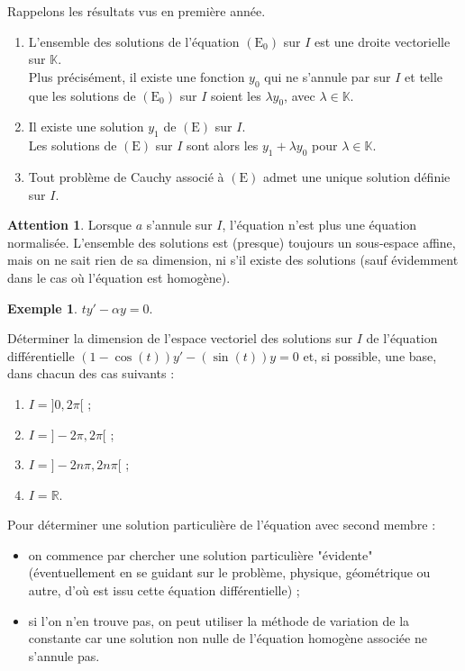 \documentclass[french]{article}
\newcommand{\R}{\mathbb{R}}
\newcommand{\K}{\mathbb{K}}
\theoremstyle{plain}
\theoremstyle{definition}
\newtheorem*{ex}{Exemple}
\newtheorem*{attention}{Attention}
\theoremstyle{remark}
\begin{document}
Rappelons les résultats vus en première année.

\begin{prop}%
	\begin{enumerate}
		\item L'ensemble des solutions de l'équation $(\text{E}_0)$ sur $I$ est une droite vectorielle sur $\K$.\\
		Plus précisément, il existe une fonction $y_0$ qui ne s'annule par sur $I$ et telle que les solutions de $(\text{E}_0)$ sur $I$ soient les $\lambda y_0$, avec $\lambda\in\K$.
		\item Il existe une solution $y_1$ de $(\text{E})$ sur $I$.\\
		Les solutions de $(\text{E})$ sur $I$ sont alors les $y_1+\lambda y_0$ pour $\lambda\in\K$.
		\item Tout problème de Cauchy associé à $(\text{E})$ admet une unique solution définie sur $I$.
	\end{enumerate}
\end{prop}

\begin{attention}
	Lorsque $a$ s'annule sur $I$, l'équation n'est plus une équation normalisée. L'ensemble des solutions est (presque) toujours un sous-espace affine, mais on ne sait rien de sa dimension, ni s'il existe des solutions (sauf évidemment dans le cas où l'équation est homogène).
\end{attention}

\begin{ex}
	$ty'-\alpha y=0$.
\end{ex}

\begin{exo}
	Déterminer la dimension de l'espace vectoriel des solutions sur $I$ de l'équation différentielle $(1-\cos(t))y'-(\sin(t))y=0$ et, si possible, une base, dans chacun des cas suivants :
	\begin{enumerate}
		\item $I=]0,2\pi[$ ;
		\item $I=]-2\pi,2\pi[$ ;
		\item $I=]-2n\pi,2n\pi[$ ;
		\item $I=\R$.
	\end{enumerate}
\end{exo}

\begin{met}
	Pour déterminer une solution particulière de l'équation avec second membre :
	\begin{itemize}
		\item on commence par chercher une solution particulière "évidente" (éventuellement en se guidant sur le problème, physique, géométrique ou autre, d'où est issu cette équation différentielle) ;
		\item si l'on n'en trouve pas, on peut utiliser la méthode de variation de la constante car une solution non nulle de l'équation homogène associée ne s'annule pas.
	\end{itemize}
\end{met}
\end{document}
